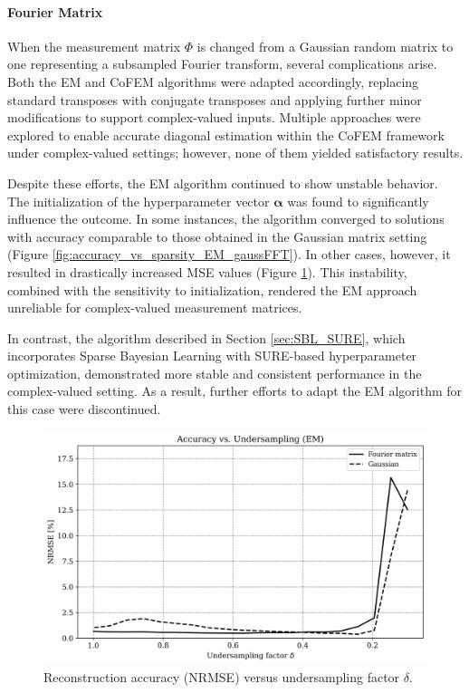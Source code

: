 \documentclass{article}
\begin{document}
\paragraph{Fourier Matrix}
When the measurement matrix $\Phi$ is changed from a Gaussian random matrix to one representing a subsampled Fourier transform, several complications arise. Both the EM and CoFEM algorithms were adapted accordingly, replacing standard transposes with conjugate transposes and applying further minor modifications to support complex-valued inputs. Multiple approaches were explored to enable accurate diagonal estimation within the CoFEM framework under complex-valued settings; however, none of them yielded satisfactory results.

Despite these efforts, the EM algorithm continued to show unstable behavior. The initialization of the hyperparameter vector $\boldsymbol{\alpha}$ was found to significantly influence the outcome. In some instances, the algorithm converged to solutions with accuracy comparable to those obtained in the Gaussian matrix setting (Figure \ref{fig:accuracy_vs_sparsity_EM_gaussFFT}). In other cases, however, it resulted in drastically increased MSE values (Figure \ref{fig:accuracy_vs_undersampling_EM_gaussFFT}). This instability, combined with the sensitivity to initialization, rendered the EM approach unreliable for complex-valued measurement matrices.

In contrast, the algorithm described in Section \ref{sec:SBL_SURE}, which incorporates Sparse Bayesian Learning with SURE-based hyperparameter optimization, demonstrated more stable and consistent performance in the complex-valued setting. As a result, further efforts to adapt the EM algorithm for this case were discontinued.


\begin{figure}[H]
    \centering
    \includegraphics[width=0.75\linewidth]{Figures/accuracy_vs_undersampling_FFTGauss_EM.png}
    \caption{Reconstruction accuracy (NRMSE) versus undersampling factor $ \delta $.}
    \label{fig:accuracy_vs_undersampling_EM_gaussFFT}
\end{figure}
\end{document}

